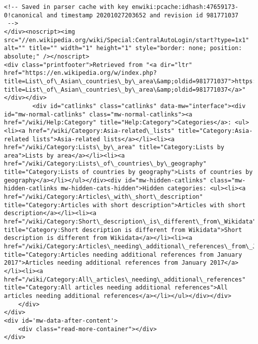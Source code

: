 \documentclass[11pt]{article}
\begin{document}
\begin{Verbatim}[commandchars=\\\{\}]
<!-- Saved in parser cache with key enwiki:pcache:idhash:47659173-0!canonical and timestamp 20201027203652 and revision id 981771037
 -->
</div><noscript><img src="//en.wikipedia.org/wiki/Special:CentralAutoLogin/start?type=1x1" alt="" title="" width="1" height="1" style="border: none; position: absolute;" /></noscript>
<div class="printfooter">Retrieved from "<a dir="ltr" href="https://en.wikipedia.org/w/index.php?title=List\_of\_Asian\_countries\_by\_area\&amp;oldid=981771037">https://en.wikipedia.org/w/index.php?title=List\_of\_Asian\_countries\_by\_area\&amp;oldid=981771037</a>"</div></div>
		<div id="catlinks" class="catlinks" data-mw="interface"><div id="mw-normal-catlinks" class="mw-normal-catlinks"><a href="/wiki/Help:Category" title="Help:Category">Categories</a>: <ul><li><a href="/wiki/Category:Asia-related\_lists" title="Category:Asia-related lists">Asia-related lists</a></li><li><a href="/wiki/Category:Lists\_by\_area" title="Category:Lists by area">Lists by area</a></li><li><a href="/wiki/Category:Lists\_of\_countries\_by\_geography" title="Category:Lists of countries by geography">Lists of countries by geography</a></li></ul></div><div id="mw-hidden-catlinks" class="mw-hidden-catlinks mw-hidden-cats-hidden">Hidden categories: <ul><li><a href="/wiki/Category:Articles\_with\_short\_description" title="Category:Articles with short description">Articles with short description</a></li><li><a href="/wiki/Category:Short\_description\_is\_different\_from\_Wikidata" title="Category:Short description is different from Wikidata">Short description is different from Wikidata</a></li><li><a href="/wiki/Category:Articles\_needing\_additional\_references\_from\_January\_2017" title="Category:Articles needing additional references from January 2017">Articles needing additional references from January 2017</a></li><li><a href="/wiki/Category:All\_articles\_needing\_additional\_references" title="Category:All articles needing additional references">All articles needing additional references</a></li></ul></div></div>
	</div>
</div>
<div id='mw-data-after-content'>
	<div class="read-more-container"></div>
</div>


\end{Verbatim}
\end{document}

